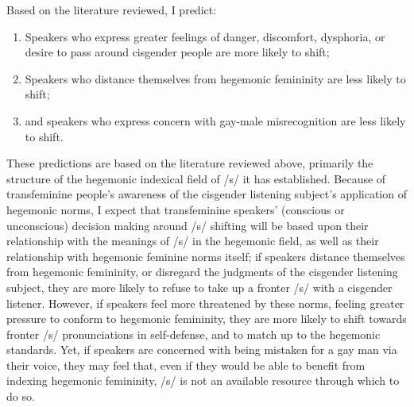 \documentclass[12pt,twoside]{reedthesis}
\begin{document}
Based on the literature reviewed, I predict:
\begin{enumerate}
\item Speakers who express greater feelings of danger, discomfort, dysphoria, or desire to pass around cisgender people are more likely to shift;
\item Speakers who distance themselves from hegemonic femininity are less likely to shift;
\item and speakers who express concern with gay-male misrecognition are less likely to shift.
\end{enumerate}
These predictions are based on the literature reviewed above, primarily the structure of the hegemonic indexical field of /s/ it has established. Because of transfeminine people's awareness of the cisgender listening subject's application of hegemonic norms, I expect that transfeminine speakers' (conscious or unconscious) decision making around /s/ shifting will be based upon their relationship with the meanings of /s/ in the hegemonic field, as well as their relationship with hegemonic feminine norms itself; if speakers distance themselves from hegemonic femininity, or disregard the judgments of the cisgender listening subject, they are more likely to refuse to take up a fronter /s/ with a cisgender listener. However, if speakers feel more threatened by these norms, feeling greater pressure to conform to hegemonic femininity, they are more likely to shift towards fronter /s/ pronunciations in self-defense, and to match up to the hegemonic standards. Yet, if speakers are concerned with being mistaken for a gay man via their voice, they may feel that, even if they would be able to benefit from indexing hegemonic femininity, /s/ is not an available resource through which to do so.

\end{document}
